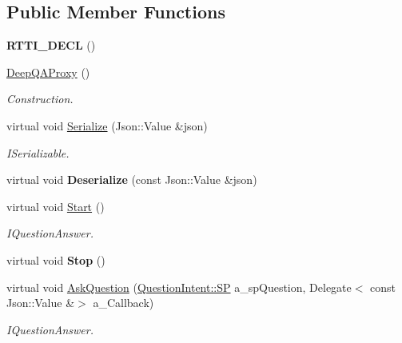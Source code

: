\subsection*{Public Member Functions}
\begin{DoxyCompactItemize}
\item 
\mbox{\label{class_deep_q_a_proxy_a634e97df15d4b8e48ee1aa3328789fe6}} 
{\bfseries R\+T\+T\+I\+\_\+\+D\+E\+CL} ()
\item 
\mbox{\label{class_deep_q_a_proxy_a7eb78b501443befd602402614986f5b6}} 
\hyperlink{class_deep_q_a_proxy_a7eb78b501443befd602402614986f5b6}{Deep\+Q\+A\+Proxy} ()
\begin{DoxyCompactList}\small\item\em Construction. \end{DoxyCompactList}\item 
\mbox{\label{class_deep_q_a_proxy_acfc85518670462ff4c2a10a974262ffc}} 
virtual void \hyperlink{class_deep_q_a_proxy_acfc85518670462ff4c2a10a974262ffc}{Serialize} (Json\+::\+Value \&json)
\begin{DoxyCompactList}\small\item\em I\+Serializable. \end{DoxyCompactList}\item 
\mbox{\label{class_deep_q_a_proxy_a9e02e288c8ad1c338bca7414e28168b7}} 
virtual void {\bfseries Deserialize} (const Json\+::\+Value \&json)
\item 
\mbox{\label{class_deep_q_a_proxy_acc2e8ddf79de3d7d26e5f741247427c9}} 
virtual void \hyperlink{class_deep_q_a_proxy_acc2e8ddf79de3d7d26e5f741247427c9}{Start} ()
\begin{DoxyCompactList}\small\item\em I\+Question\+Answer. \end{DoxyCompactList}\item 
\mbox{\label{class_deep_q_a_proxy_a83687a3cee183761323ec521f66c816e}} 
virtual void {\bfseries Stop} ()
\item 
\mbox{\label{class_deep_q_a_proxy_aa922a952efa963f782311cce4bc70b89}} 
virtual void \hyperlink{class_deep_q_a_proxy_aa922a952efa963f782311cce4bc70b89}{Ask\+Question} (\hyperlink{class_question_intent_a250dceb08e1342574a0aca4fe40a7121}{Question\+Intent\+::\+SP} a\+\_\+sp\+Question, Delegate$<$ const Json\+::\+Value \&$>$ a\+\_\+\+Callback)
\begin{DoxyCompactList}\small\item\em I\+Question\+Answer. \end{DoxyCompactList}\end{DoxyCompactItemize}
